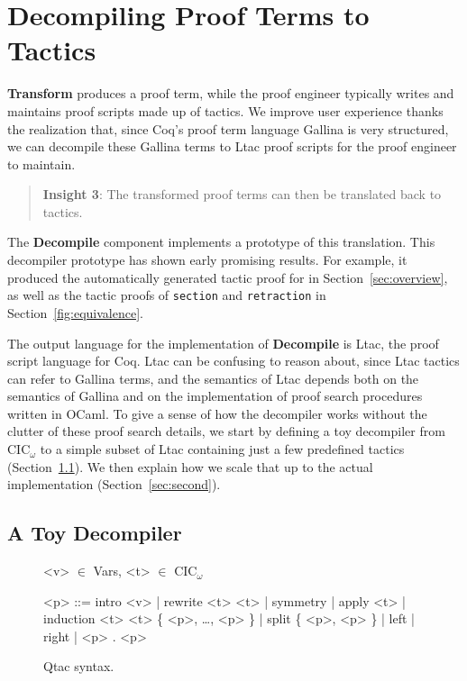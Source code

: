 \section{Decompiling Proof Terms to Tactics}
\label{sec:decompiler}

\textbf{Transform} produces a proof term,
while the proof engineer typically writes and maintains proof scripts made up of tactics.
We improve user experience thanks the realization that, since Coq's proof term language Gallina is very structured,
we can decompile these Gallina terms to Ltac proof scripts for the proof engineer to maintain.

\begin{quote}
\textbf{Insight 3}: The transformed proof terms can then be translated back to tactics.
\end{quote}

The \textbf{Decompile} component implements a prototype of this translation.
This decompiler prototype has shown early promising results.
For example, it produced the automatically generated tactic proof for  
in Section~\ref{sec:overview}, as well as the tactic proofs of \lstinline{section}
and \lstinline{retraction} in Section~\ref{fig:equivalence}.

The output language for the implementation of \textbf{Decompile} is Ltac, the proof script language for Coq.
Ltac can be confusing to reason about, since Ltac tactics can refer to Gallina terms, and the semantics of Ltac depends both on the
semantics of Gallina and on the implementation of proof search procedures written in OCaml.
To give a sense of how the decompiler works without the clutter of these proof search details, we start by defining a toy
decompiler from CIC$_{\omega}$ to a simple subset of Ltac containing just a few predefined tactics (Section~\ref{sec:first}).
We then explain how we scale that up to the actual implementation (Section~\ref{sec:second}).

\subsection{A Toy Decompiler}
\label{sec:first}

\begin{figure}
\small
\begin{grammar}
<v> $\in$ Vars, <t> $\in$ CIC$_{\omega}$

<p> ::= intro <v> |  rewrite <t> <t> | symmetry | apply <t> | induction <t> <t> \{ <p>, \ldots, <p> \} | split \{ <p>, <p> \} | left | right | <p> . <p>
\end{grammar}
\caption{Qtac syntax.}
\label{fig:ltacsyntax1}
\end{figure}

